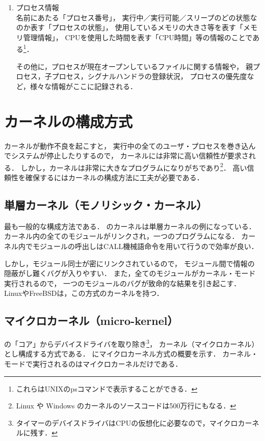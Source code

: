 \begin{enumerate}
\begin{enumerate}
\end{enumerate}

\item プロセス情報 \\
名前にあたる「プロセス番号」，
実行中／実行可能／スリープのどの状態なのか表す「プロセスの状態」，
使用しているメモリの大きさ等を表す「メモリ管理情報」，
CPUを使用した時間を表す「CPU時間」等の情報のことである\footnote{
これらはUNIXのpsコマンドで表示することができる．}．

その他に，プロセスが現在オープンしているファイルに関する情報や，
親プロセス，子プロセス，シグナルハンドラの登録状況，
プロセスの優先度など，様々な情報がここに記録される．
\end{enumerate}

\section{カーネルの構成方式}
カーネルが動作不良を起こすと，
実行中の全てのユーザ・プロセスを巻き込んでシステムが停止したりするので，
カーネルには非常に高い信頼性が要求される．
しかし，カーネルは非常に大きなプログラムになりがちであり\footnote{
Linux や Windows のカーネルのソースコードは500万行にもなる\cite{lines}．}．
高い信頼性を確保するにはカーネルの構成方法に工夫が必要である．

\subsection{単層カーネル（モノリシック・カーネル）}
最も一般的な構成方法である．
のカーネルは単層カーネルの例になっている．
カーネル内の全てのモジュールがリンクされ，一つのプログラムになる．
カーネル内でモジュールの呼出しはCALL機械語命令を用いて行うので効率が良い．

しかし，モジュール同士が密にリンクされているので，
モジュール間で情報の隠蔽がし難くバグが入りやすい．
また，全てのモジュールがカーネル・モード実行されるので，
一つのモジュールのバグが致命的な結果を引き起こす．
LinuxやFreeBSDは，この方式のカーネルを持つ．

\subsection{マイクロカーネル（micro-kernel）}
の「コア」からデバイスドライバを取り除き\footnote{
タイマーのデバイスドライバはCPUの仮想化に必要なので，マイクロカーネルに残す．}，
カーネル（マイクロカーネル）とし構成する方式である．
にマイクロカーネル方式の概要を示す．
カーネル・モードで実行されるのはマイクロカーネルだけである．

